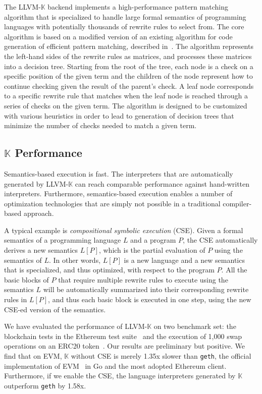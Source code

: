 \documentclass{article}
\newcommand{\code}[1]{\texttt{#1}}
\newcommand{\K}{\ensuremath{\mathbb{K}}\xspace}
\newcommand{\KL}{LLVM-\K}
\begin{document}
The LLVM-\K backend implements a high-performance pattern matching algorithm that is specialized to
handle large formal semantics of programming languages with
potentially thousands of rewrite rules to select from.
The core algorithm is based on a modified version of an
existing algorithm for code generation of efficient pattern matching, described in~\cite{Maranget2008}.
The algorithm represents the left-hand sides of the rewrite rules as matrices,
and processes these matrices into a decision tree.
Starting from the root of the tree, each node is a check on a specific position of the given term and the children of the node represent how to continue checking given the result of the parent’s check.
A leaf node corresponds to a specific rewrite rule that matches when the leaf node is reached through a series of checks on the given term.
The algorithm is designed to be customized with various heuristics in order to lead to generation of decision trees that minimize the number of checks needed to match a given term.

\subsection{\K Performance}

Semantics-based execution is fast. 
The interpreters that are automatically generated by \KL can reach comparable performance against
hand-written interpreters. 
Furthermore, semantics-based execution enables a number of optimization technologies
that are simply not possible in a traditional compiler-based approach. 

A typical example is \emph{compositional symbolic execution} (CSE). 
Given a formal semantics of a programming language $L$ and a program $P$,
the CSE automatically derives a new semantics $L[P]$, which is the partial evaluation 
of $P$ using the semantics of $L$. 
In other words, $L[P]$ is a new language and a new semantics that is specialized, and thus optimized, with respect to
the program $P$. 
All the basic blocks of $P$ that require multiple rewrite rules to execute using the semantics $L$
will be automatically summarized into their corresponding rewrite rules in $L[P]$, and thus each basic block is executed in one step, using the new CSE-ed version of the semantics. 

We have evaluated the performance of \KL on two benchmark set:
the blockchain tests in the Ethereum test suite~\cite{ethereum-tests}
and the execution of 1,000 swap operations on an ERC20 token~\cite{1kswapscode}. Our results are 
preliminary but positive.
We find that on EVM, \K without CSE is merely 1.35x slower than \code{geth}, 
the official implementation of EVM~\cite{geth} in Go and the most adopted Ethereum client.
Furthermore, if we enable the CSE, 
the language interpreters generated by \K outperform \code{geth} by 1.58x.
\end{document}
